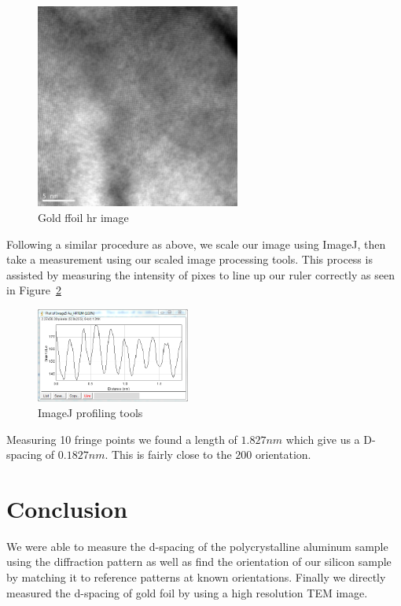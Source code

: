 \documentclass[12pt,a4paper]{article}
\begin{document}
\begin{figure}[htbp]
  \centering
  \includegraphics[width=0.6\textwidth]{data/Image5 Au_HRTEM.png}
  \caption{Gold ffoil \ac{hr} image}
  \label{fig:hr_au}
\end{figure}

Following a similar procedure as above, we scale our image using ImageJ, then take a measurement using our scaled image processing tools. This process is assisted by measuring the intensity of pixes to line up our ruler correctly as seen in Figure~\ref{fig:profile}

\begin{figure}
  \includegraphics[width=0.45\textwidth]{data/Image5 Au_HRTEM profile.png}
  \caption{ImageJ profiling tools}
  \label{fig:profile}
\end{figure}

Measuring 10 fringe points we found a length of $1.827 nm$ which give us a D-spacing of $0.1827 nm$. This is fairly close to the $2 0 0$ orientation\cite{aluminum}.


\section{Conclusion} %

We were able to measure the d-spacing of the polycrystalline aluminum sample using the diffraction pattern as well as find the orientation of our silicon sample by matching it to reference patterns at known orientations.  Finally we directly measured the d-spacing of gold foil by using a high resolution TEM image.

 
 \nocite{*}
\end{document}
